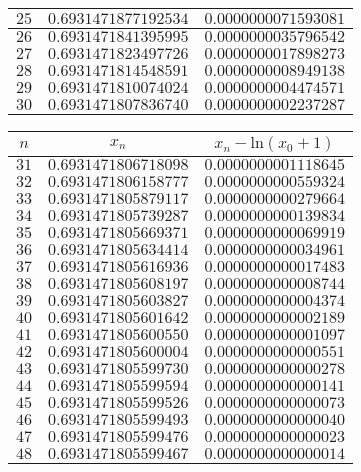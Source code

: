 \documentclass{article}
\begin{document}
\begin{enumerate}
\begin{enumerate}
\begin{table}[H]
\begin{tabular}{ |c|c|c| }
 \hline
$25$ & $0.6931471877192534$ & $0.0000000071593081$ \\
 \hline
$26$ & $0.6931471841395995$ & $0.0000000035796542$ \\
 \hline
$27$ & $0.6931471823497726$ & $0.0000000017898273$ \\
 \hline
$28$ & $0.6931471814548591$ & $0.0000000008949138$ \\
 \hline
$29$ & $0.6931471810074024$ & $0.0000000004474571$ \\
 \hline
$30$ & $0.6931471807836740$ & $0.0000000002237287$ \\
 \hline
\end{tabular}
\quad
\begin{tabular}{ |c|c|c| }
\hline
$n$ & $x_n$ & $x_n - \mbox{ln}(x_0+1)$ \\
\hline
$31$ & $0.6931471806718098$ & $0.0000000001118645$ \\
 \hline
$32$ & $0.6931471806158777$ & $0.0000000000559324$ \\
 \hline
$33$ & $0.6931471805879117$ & $0.0000000000279664$ \\
 \hline
$34$ & $0.6931471805739287$ & $0.0000000000139834$ \\
 \hline
$35$ & $0.6931471805669371$ & $0.0000000000069919$ \\
 \hline
$36$ & $0.6931471805634414$ & $0.0000000000034961$ \\
 \hline
$37$ & $0.6931471805616936$ & $0.0000000000017483$ \\
 \hline
$38$ & $0.6931471805608197$ & $0.0000000000008744$ \\
 \hline
$39$ & $0.6931471805603827$ & $0.0000000000004374$ \\
 \hline
$40$ & $0.6931471805601642$ & $0.0000000000002189$ \\
 \hline
$41$ & $0.6931471805600550$ & $0.0000000000001097$ \\
 \hline
$42$ & $0.6931471805600004$ & $0.0000000000000551$ \\
 \hline
$43$ & $0.6931471805599730$ & $0.0000000000000278$ \\
 \hline
$44$ & $0.6931471805599594$ & $0.0000000000000141$ \\
 \hline
$45$ & $0.6931471805599526$ & $0.0000000000000073$ \\
 \hline
$46$ & $0.6931471805599493$ & $0.0000000000000040$ \\
 \hline
$47$ & $0.6931471805599476$ & $0.0000000000000023$ \\
 \hline
$48$ & $0.6931471805599467$ & $0.0000000000000014$ \\

\end{tabular}
\end{table}
\end{enumerate}
\end{enumerate}
\end{document}
